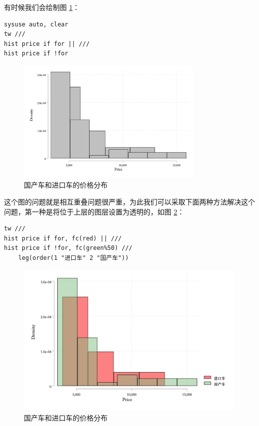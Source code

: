 有时候我们会绘制图 \ref{fig:histautoprice}：

\begin{lstlisting}
sysuse auto, clear
tw ///
hist price if for || ///
hist price if !for
\end{lstlisting}

\begin{figure}[htbp]
  \centering \includegraphics[width=0.8\textwidth]{assets/histautoprice.png}
  \caption{国产车和进口车的价格分布}\label{fig:histautoprice}
\end{figure}

这个图的问题就是相互重叠问题很严重，为此我们可以采取下面两种方法解决这个问题，第一种是将位于上层的图层设置为透明的，如图 \ref{fig:histautoprice2}：

\begin{lstlisting}
tw ///
hist price if for, fc(red) || ///
hist price if !for, fc(green%50) ///
    leg(order(1 "进口车" 2 "国产车"))
\end{lstlisting}

\begin{figure}[htbp]
  \centering
  \includegraphics[width=\textwidth]{assets/histautoprice2.png}
  \caption{国产车和进口车的价格分布}\label{fig:histautoprice2}
\end{figure}

